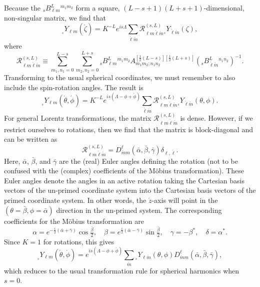 \documentclass[11pt]{article}
\newcommand{\swY}[4][]{{}_{{}_{#2}}\!Y^{#1}_{#3}(#4)}
\begin{document}
Because the ${}_sB^L_{\ell m}{}^{m_1m_2}$ form a square,
$(L-s+1)(L+s+1)$-dimensional, non-singular matrix, we find that
\begin{equation}
\swY{s}{\ell m}{\acute\zeta}=K^{-L}e^{is\Lambda}\sum_{\acute\ell\acute{m}}
         \mathcal{R}^{(s,L)}_{\ell m\acute\ell\acute{m}}
         \swY{s}{\acute\ell\acute{m}}{\zeta},
\end{equation}
where
\begin{equation}
  \mathcal{R}^{(s,L)}_{\ell m\acute\ell\acute{m}}\equiv
    \sum_{m_1,n_1=0}^{L-s} \sum_{m_2,n_2=0}^{L+s}
         {}_sB^L_{\ell m}{}^{m_1m_2}
         A^{[\frac12(L-s)][\frac12(L+s)]}_{m_1m_2;n_1n_2}
         \left( {}_sB^L_{\acute\ell\acute{m}}{}^{n_1n_2}\right)^{-1}.
\end{equation}
Transforming to the usual spherical coordinates, we must remember to also
include the spin-rotation angles.  The result is
\begin{equation}\label{eq:LorentzYTrans}
\swY{s}{\ell m}{\acute\theta,\acute\phi}=
     K^{-L}e^{is(\Lambda-\phi+\acute\phi)}\sum_{\acute\ell\acute{m}}
         \mathcal{R}^{(s,L)}_{\ell m\acute\ell\acute{m}}
                 \swY{s}{\acute\ell\acute{m}}{\theta,\phi}.
\end{equation}
For general Lorentz transformations, the matrix
$\mathcal{R}^{(s,L)}_{\ell m\acute\ell\acute{m}}$ is dense.  However,
if we restrict ourselves to rotations, then we find that the matrix is
block-diagonal and can be written as
\begin{equation}
  \mathcal{R}^{(s,L)}_{\ell m\acute\ell\acute{m}} = 
  D^\ell_{\acute{m}m}(\bar\alpha,\bar\beta,\bar\gamma)\delta_{\ell,\acute\ell}.
\end{equation}
Here, $\bar\alpha$, $\bar\beta$, and $\bar\gamma$ are the (real) Euler
angles defining the rotation (not to be confused with the (complex)
coefficients of the M\"{o}bius transformation).  These Euler angles
denote the angles in an active rotation taking the Cartesian basis
vectors of the un-primed coordinate system into the Cartesian basis
vectors of the primed coordinate system.  In other words, the
$\acute{z}$-axis will point in the $(\theta=\bar\beta,\phi=\bar\alpha)$
direction in the un-primed system.  The corresponding coefficients for
the M\"{o}bius transformation are
\begin{equation}
  \alpha = e^{-\frac{i}2(\bar\alpha+\bar\gamma)}\cos\tfrac{\bar\beta}2,
\quad
  \beta = e^{\frac{i}2(\bar\alpha-\bar\gamma)}\sin\tfrac{\bar\beta}2,
\quad
  \gamma = -\beta^*,
\quad
  \delta = \alpha^*. 
\end{equation}
Since $K=1$ for
rotations, this gives
\begin{equation}
\swY{s}{\ell m}{\acute\theta,\acute\phi}=
     e^{is(\Lambda-\phi+\acute\phi)}\sum_{\acute{m}}
         \swY{s}{\ell\acute{m}}{\theta,\phi}
         D^\ell_{\acute{m}m}(\bar\alpha,\bar\beta,\bar\gamma),
\end{equation}
which reduces to the usual transformation rule for spherical harmonics
when $s=0$.
\end{document}
